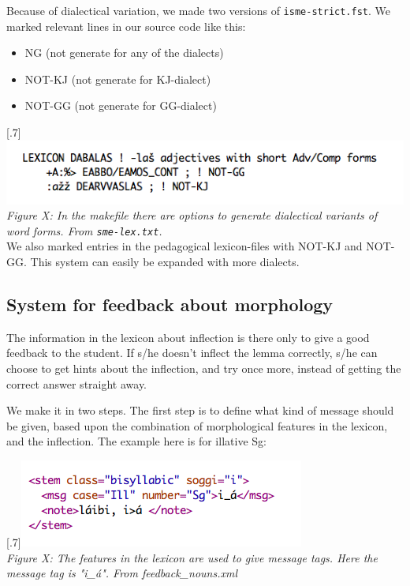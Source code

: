 \documentclass[a4paper,12pt]{article}
\begin{document}
Because of dialectical variation, we made two versions of \texttt{isme-strict.fst}. We marked relevant lines in our source code like this:
\begin {itemize}
\item NG (not generate for any of the dialects)
\item NOT-KJ (not generate for KJ-dialect) 
\item NOT-GG (not generate for GG-dialect)  
\end {itemize}

\scalebox{.7}[.7]{\includegraphics{img/smelex.png}}\\
\textit{Figure X: In the makefile there are options to generate dialectical variants of word forms. From \texttt{sme-lex.txt}.}\\ 

We also marked entries in the pedagogical lexicon-files with NOT-KJ and NOT-GG. This system can easily be expanded with more dialects.

\subsection{System for feedback about morphology}

The information in the lexicon about inflection is there only to give a good feedback to the student. If s/he doesn't inflect the lemma correctly, s/he can choose to get hints about the inflection, and try once more, instead of getting the correct answer straight away. 

We make it in two steps. The first step is to define what kind of message should be given, based upon the combination of morphological features in the lexicon, and the inflection. The example here is for illative Sg:


\scalebox{.7}[.7]{\includegraphics{img/feedback_nouns.png}}\\
\textit{Figure X: The features in the lexicon are used to give message tags. Here the message tag is "i\_á". From feedback\_nouns.xml}\\ 
\end{document}
